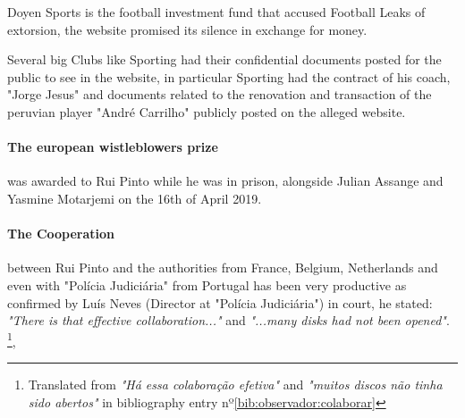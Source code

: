 Doyen Sports is the football investment fund that accused Football Leaks of extorsion, the website promised its silence in exchange for money.

Several big Clubs like Sporting had their confidential documents posted for the public to see in the website, in particular Sporting had the contract of his coach, "Jorge Jesus" and documents related to the renovation and transaction of the peruvian player "André Carrilho" publicly posted on the alleged website.

\paragraph{The european wistleblowers prize} was awarded to Rui Pinto while he was in prison, alongside Julian Assange and Yasmine Motarjemi on the 16th of April 2019.

\paragraph{The Cooperation} between Rui Pinto and the authorities from France, Belgium, Netherlands and even with "Polícia Judiciária" from Portugal has been very productive as confirmed by Luís Neves (Director at "Polícia Judiciária") in court, he stated: \textit{"There is that effective collaboration..."} and \textit{"...many disks had not been opened"}.
\footnote{ Translated from \textit{"Há essa colaboração efetiva"} and \textit{"muitos discos não tinha sido abertos"} in bibliography entry nº\ref{bib:observador:colaborar} },  



